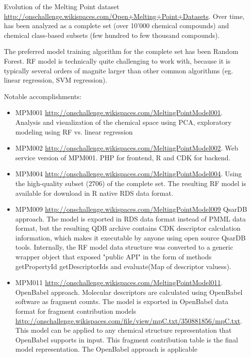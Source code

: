 \documentclass[12pt,letterpaper]{article}
\begin{document}
Evolution of the Melting Point dataset \url{http://onschallenge.wikispaces.com/Open+Melting+Point+Datasets}. Over time, has been analyzed as a complete set 
(over 10'000 chemical compounds) and chemical class-based subsets (few
hundred to few thousand compounds).

The preferred model training algorithm for the complete set has been
Random Forest. RF model is technically quite challenging to work with,
because it is typically several orders of magnite larger than other
common algorithms (eg. linear regression, SVM regression).

Notable accomplishments:
\begin{itemize}
  \item MPM001 \url{http://onschallenge.wikispaces.com/MeltingPointModel001}.
  Analysis and visualization of the chemical space using PCA, exploratory 
  modeling using RF vs. linear regression
  \item MPM002 \url{http://onschallenge.wikispaces.com/MeltingPointModel002}.
  Web service version of MPM001. PHP for frontend, R and CDK for backend.
  \item MPM004 \url{http://onschallenge.wikispaces.com/MeltingPointModel004}.
  Using the high-quality subset (2706) of the complete set. The resulting RF
  model is available for download in R native RDS data format.
  \item MPM009 \url{http://onschallenge.wikispaces.com/MeltingPointModel009}
  QsarDB approach. The model is exported in RDS data format instead of PMML
  data format, but the resulting QDB archive contains CDK descriptor calculation
  information, which makes it executable by anyone using open source QsarDB 
  tools. Internally, the RF model data structure was converted to a generic
  wrapper object that exposed "public API" in the form of methods getPropertyId
  getDescriptorIds and evaluate(Map of descriptor valuess).
  \item MPM011 \url{http://onschallenge.wikispaces.com/MeltingPointModel011}.
  OpenBabel approach. Molecular descriptors are calculated using OpenBabel
  software as fragment counts. The model is exported in OpenBabel data format
  for fragment contribution models \url{http://onschallenge.wikispaces.com/file/view/mpC.txt/350881856/mpC.txt}. This model can be applied to any chemical structure
  representation that OpenBabel supports in input. This fragment contribution 
  table is the final model representation. The OpenBabel approach is applicable

\end{itemize}
\end{document}
